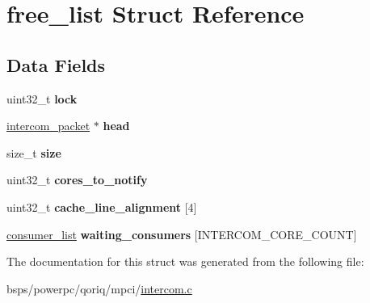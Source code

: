 \hypertarget{structfree__list}{}\section{free\+\_\+list Struct Reference}
\label{structfree__list}
\subsection*{Data Fields}
\begin{DoxyCompactItemize}
\item 
\mbox{\label{structfree__list_aabb945b431047a679f74ef6f571b4bf5}} 
uint32\+\_\+t {\bfseries lock}
\item 
\mbox{\label{structfree__list_ad64e4b293c3a7a90d9751d6ab1a83a62}} 
\mbox{\hyperlink{structintercom__packet}{intercom\+\_\+packet}} $\ast$ {\bfseries head}
\item 
\mbox{\label{structfree__list_a8d768f6a75ba490c4455ad0682b00731}} 
size\+\_\+t {\bfseries size}
\item 
\mbox{\label{structfree__list_a8ae763e51d45376b4ec963bdf37beb6b}} 
uint32\+\_\+t {\bfseries cores\+\_\+to\+\_\+notify}
\item 
\mbox{\label{structfree__list_a34d20820c24d85b454379e0490b6578f}} 
uint32\+\_\+t {\bfseries cache\+\_\+line\+\_\+alignment} \mbox{[}4\mbox{]}
\item 
\mbox{\label{structfree__list_af779f5f3551a8f411eafae98d4a19368}} 
\mbox{\hyperlink{structconsumer__list}{consumer\+\_\+list}} {\bfseries waiting\+\_\+consumers} \mbox{[}I\+N\+T\+E\+R\+C\+O\+M\+\_\+\+C\+O\+R\+E\+\_\+\+C\+O\+U\+NT\mbox{]}
\end{DoxyCompactItemize}


The documentation for this struct was generated from the following file\+:\begin{DoxyCompactItemize}
\item 
bsps/powerpc/qoriq/mpci/\mbox{\hyperlink{intercom_8c}{intercom.\+c}}\end{DoxyCompactItemize}
